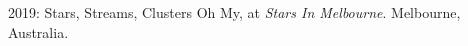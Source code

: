 \item[{\color{numcolor}\scriptsize1}] 2019: Stars, Streams, Clusters Oh My, at \textit{Stars In Melbourne}. Melbourne, Australia.
